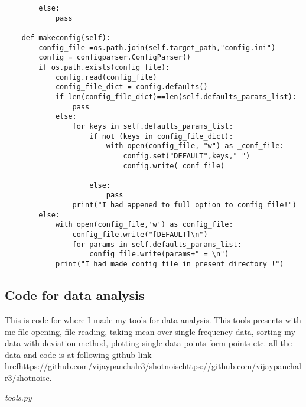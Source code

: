 \documentclass[12pt]{article}
\begin{document}
\begin{verbatim}
        else:
            pass

    def makeconfig(self):
        config_file =os.path.join(self.target_path,"config.ini")
        config = configparser.ConfigParser()
        if os.path.exists(config_file):
            config.read(config_file)
            config_file_dict = config.defaults()
            if len(config_file_dict)==len(self.defaults_params_list):
                pass
            else:
                for keys in self.defaults_params_list:
                    if not (keys in config_file_dict):
                        with open(config_file, "w") as _conf_file: 
                            config.set("DEFAULT",keys," ")
                            config.write(_conf_file)
                            
                    else:
                        pass
                print("I had appened to full option to config file!")
        else:
            with open(config_file,'w') as config_file:
                config_file.write("[DEFAULT]\n")
                for params in self.defaults_params_list:
                    config_file.write(params+" = \n")
            print("I had made config file in present directory !")

\end{verbatim}

            
\subsection*{Code for data analysis}

This is code for where I made my tools for data analysis. This tools presents with me file opening, file reading, taking mean over single frequency data, sorting my data with deviation method, plotting single data points form points etc. all the data and code is at following github link href{https://github.com/vijaypanchalr3/shotnoise}{https://github.com/vijaypanchalr3/shotnoise}. 

\emph{tools.py}
\end{document}
